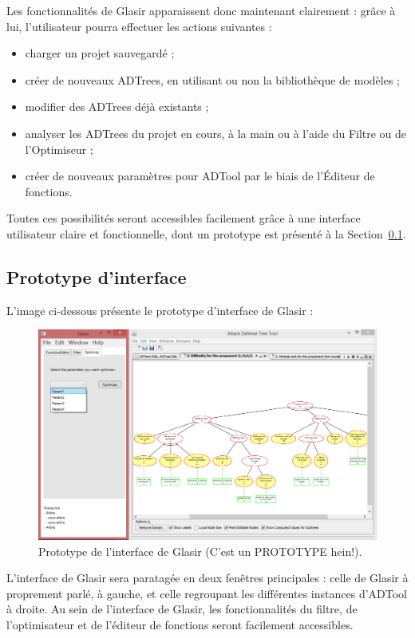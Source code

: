     Les fonctionnalités de Glasir apparaissent donc maintenant clairement : grâce à lui, l'utilisateur pourra effectuer les actions suivantes : 

    \begin{itemize}
    \item charger un projet sauvegardé ;
    \item créer de nouveaux ADTrees, en utilisant ou non la bibliothèque de modèles ;
    \item modifier des ADTrees déjà existants ;
    \item analyser les ADTrees du projet en cours, à la main ou à l'aide du Filtre ou de l'Optimiseur ;
    \item créer de nouveaux paramètres pour ADTool par le biais de l'Éditeur de fonctions.
    \end{itemize}  

    Toutes ces possibilités seront accessibles facilement grâce à une interface utilisateur claire et fonctionnelle, dont un prototype est présenté à la {\sc Section}~\ref{sec:interface}.      
    
    \subsection{Prototype d'interface}
    \label{sec:interface}
    
    L'image ci-dessous présente le prototype d'interface de Glasir :

    \begin{figure}[h!]
        \centering
        \includegraphics[height=0.4\textwidth]{figure/interface.png}
        \caption{Prototype de l'interface de Glasir (C'est un PROTOTYPE hein!).}
        \label{fig:interface}
    \end{figure}
    
L'interface de Glasir sera paratagée en deux fenêtres principales : celle de Glasir à proprement parlé, à gauche, et celle regroupant les différentes instances d'ADTool à droite. Au sein de l'interface de Glasir, les fonctionnalités du filtre, de l'optimisateur et de l'éditeur de fonctions seront facilement accessibles.

